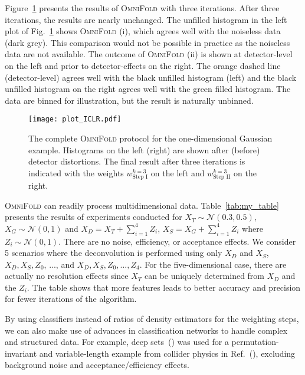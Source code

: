 \documentclass{article} %
\begin{document}
Figure~\ref{fig:result} presents the results of \textsc{OmniFold} with three iterations.  After three iterations, the results are nearly unchanged.  The unfilled histogram in the left plot of Fig.~\ref{fig:result} shows \textsc{OmniFold} (i), which agrees well with the noiseless data (dark grey).  This comparison would not be possible in practice as the noiseless data are not available.  The outcome of \textsc{OmniFold} (ii) is shown at detector-level on the left and prior to detector-effects on the right.  The orange dashed line (detector-level) agrees well with the black unfilled histogram (left) and the black unfilled histogram on the right agrees well with the green filled histogram.  The data are binned for illustration, but the result is naturally unbinned.

\begin{figure}
    \centering
    \texttt{[image: plot\_ICLR.pdf]}
    \caption{The complete \textsc{OmniFold} protocol for the one-dimensional Gaussian example.  Histograms on the left (right) are shown after (before) detector distortions.  The final result after three iterations is indicated with the weights $w_\text{Step I}^{k=3}$ on the left and $w_\text{Step II}^{k=3}$ on the right.}
    \label{fig:result}
\end{figure}

\textsc{OmniFold} can readily process multidimensional data.  Table~\ref{tab:my_table} presents the results of experiments conducted for $X_T\sim\mathcal{N}(0.3,0.5)$, $X_G\sim\mathcal{N}(0,1)$ and $X_D=X_T+\sum_{i=1}^4 Z_i$, $X_S=X_G+\sum_{i=1}^4 Z_i$ where $Z_i\sim\mathcal{N}(0,1)$.  There are no noise, efficiency, or acceptance effects.  We consider 5 scenarios where the deconvolution is performed using only $X_D$ and $X_S$, $X_D,X_S,Z_0$, ..., and $X_D,X_S,Z_0,...,Z_4$.  For the five-dimensional case, there are actually no resolution effects since $X_T$ can be uniquely determined from $X_D$ and the $Z_i$.  The table shows that more features leads to better accuracy and precision for fewer iterations of the algorithm.

By using classifiers instead of ratios of density estimators for the weighting steps, we can also make use of advances in classification networks to handle complex and structured data.  For example, deep sets~(\cite{zaheer2018deep,Komiske:2018cqr}) was used for a permutation-invariant and variable-length example from collider physics in Ref.~(\cite{Andreassen:2019cjw}), excluding background noise and acceptance/efficiency effects.
\end{document}

